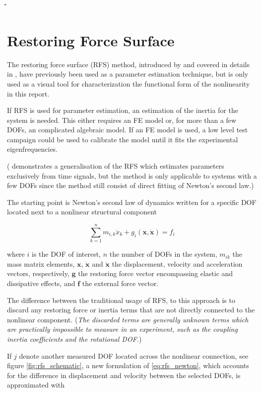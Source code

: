 ̈́\section{Restoring Force Surface}
\label{sec:rfs_description}

The restoring force surface (RFS) method, introduced by \cite{masri1979a} and
covered in details in \autocite{worden1990a}, have previously been used
as a parameter estimation technique, but is only used as a visual tool for
characterization the functional form of the nonlinearity in this report.

If RFS is used for parameter estimation, an estimation of the inertia for the
system is needed. This either requires an FE model or, for more than a few DOFs,
an complicated algebraic model. If an FE model is used, a low level test campaign
could be used to calibrate the model until it fits the experimental
eigenfrequencies.

(\autocite{masri2004a} demonstrates a generalisation of the RFS which estimates
parameters exclusively from time signals, but the method is only applicable to
systems with a few DOFs since the method still consist of direct fitting of
Newton's second law.)


The starting point is Newton's second law of dynamics written for a specific DOF
located next to a nonlinear structural component

\begin{equation}
  \label{eq:rfs_newton}
  \sum_{k=1}^{n} m_{i,k} \ddot x_k + g_i(\bm x, \dot{ \bm x}) = f_i
\end{equation}

where $i$ is the DOF of interest, $n$ the number of DOFs in the system, $m_{ik}$
the mass matrix elements, $\bm x$, $\dot{\bm x}$ and $\ddot{ \bm x}$ the
displacement, velocity and acceleration vectors, respectively, $\bm g$ the
restoring force vector encompassing elastic and dissipative effects, and $\bm f$
the external force vector.

The difference between the traditional usage of RFS, to this approach is to
discard any restoring force or inertia terms that are not directly connected to
the nonlinear component. (\textit{The discarded terms are generally unknown
  terms which are practically impossible to measure in an experiment, such as
  the coupling inertia coefficients and the rotational DOF.})

If $j$ denote another measured DOF located across the nonlinear connection, see
figure \ref{fig:rfs_schematic}, a new formulation of \eqref{eq:rfs_newton},
which accounts for the difference in displacement and velocity between the
selected DOFs, is approximated with

